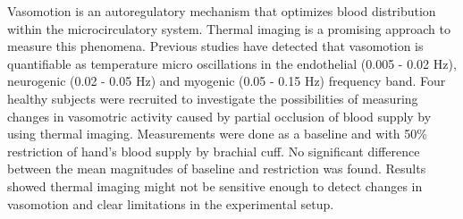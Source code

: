 Vasomotion is an autoregulatory mechanism that optimizes blood distribution within the microcirculatory system. Thermal imaging is a promising approach to measure this phenomena.	
Previous studies have detected that vasomotion is quantifiable as temperature micro oscillations in the endothelial (0.005 - 0.02 Hz), neurogenic (0.02 - 0.05 Hz) and myogenic (0.05 - 0.15 Hz) frequency band. Four healthy subjects were recruited to investigate the possibilities of measuring changes in vasomotric activity caused by partial occlusion of blood supply by using thermal imaging.
Measurements were done as a baseline and with 50\% restriction of hand$’$s blood supply by brachial cuff.
No significant difference between the mean magnitudes of baseline and restriction was found. 
Results showed thermal imaging might not be sensitive enough to detect changes in vasomotion and clear limitations in the experimental setup.